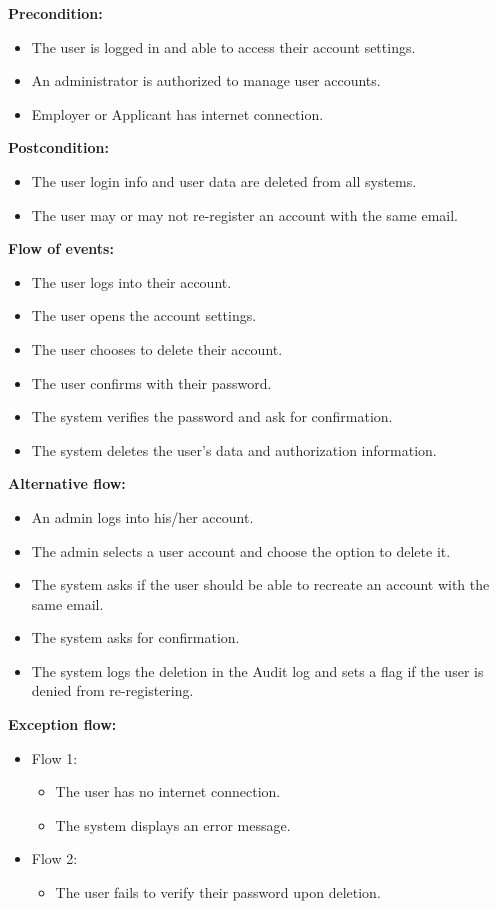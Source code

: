 \documentclass[a4paper]{article}
\begin{document}
\textbf{Precondition:}
\begin{itemize}
    \item The user is logged in and able to access their account settings.
    \item An administrator is authorized to manage user accounts.
    \item Employer or Applicant has internet connection.
\end{itemize}

\textbf{Postcondition:}
\begin{itemize}
    \item The user login info and user data are deleted from all systems.
    \item The user may or may not re-register an account with the same email.
\end{itemize}

\textbf{Flow of events:}
\begin{itemize}
    \item The user logs into their account.
    \item The user opens the account settings.
    \item The user chooses to delete their account.
    \item The user confirms with their password.
    \item The system verifies the password and ask for confirmation.
    \item The system deletes the user's data and authorization information.
\end{itemize}

\textbf{Alternative flow:}
\begin{itemize}
    \item An admin logs into his/her account.
    \item The admin selects a user account and choose the option to delete it.
    \item The system asks if the user should be able to recreate an account with the same email.
    \item The system asks for confirmation.
    \item The system logs the deletion in the Audit log and sets a flag if the user is denied from re-registering.
\end{itemize}

\textbf{Exception flow:}
\begin{itemize}
    \item Flow 1:
          \begin{itemize}
              \item The user has no internet connection.
              \item The system displays an error message.
          \end{itemize}
    \item Flow 2:
          \begin{itemize}
              \item The user fails to verify their password upon deletion.
          \end{itemize}
\end{itemize}
\end{document}
